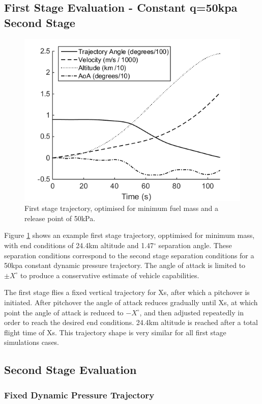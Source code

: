 \documentclass[]{aiaa-tc}
\begin{document}
\subsection{First Stage Evaluation - Constant q=50kpa Second Stage}
\begin{figure}[!ht]
	\centering
	\includegraphics[width=.7\linewidth]{FirstStage}
	\caption{First stage trajectory, optimised for minimum fuel mass and a release point of 50kPa.}
	\label{fig:FirstStage}
\end{figure}
Figure \ref{fig:FirstStage} shows an example first stage trajectory, opptimised for minimum mass, with end conditions of 24.4km altitude and 1.47$^\circ$ separation angle. These separation conditions correspond to the second stage separation conditions for a 50kpa constant dynamic pressure trajectory. The angle of attack is limited to $\pm X^\circ$ to produce a conservative estimate of vehicle capabilities.  

The first stage flies a fixed vertical trajectory for Xs, after which a pitchover is initiated. 
After pitchover the angle of attack reduces gradually until Xs, at which point the angle of attack is reduced to $-X^\circ$, and then adjusted repeatedly in order to reach the desired end conditions. 
 24.4km altitude is reached after a total flight time of Xs. 
This trajectory shape is very similar for all first stage simulations cases. 








\subsection{Second Stage Evaluation}
\subsubsection{Fixed Dynamic Pressure Trajectory} \label{subsection:Fixed}
\end{document}
